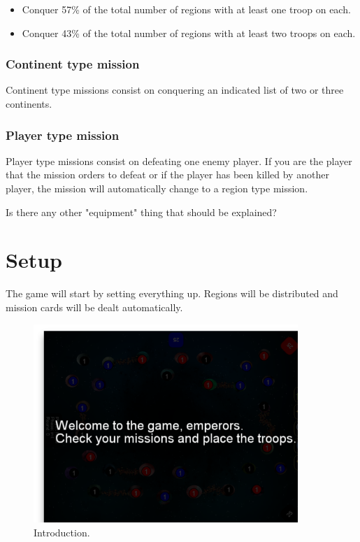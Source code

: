 \documentclass[12pt,a4paper]{article}
\begin{document}
\begin{itemize}
\item Conquer 57\% of the total number of regions with at least one troop on each.
\item Conquer 43\% of the total number of regions with at least two troops on each.
\end{itemize}

\subsubsection{Continent type mission}
Continent type missions consist on conquering an indicated list of two or three continents.

\subsubsection{Player type mission}
Player type missions consist on defeating one enemy player. If you are the player that the mission orders to defeat or if the player has been killed by another player, the mission will automatically change to a region type mission.

\begin{todo}[Alberto]
  Is there any other "equipment" thing that should be explained?
\end{todo}

\section{Setup}
The game will start by setting everything up. Regions will be distributed and mission cards will be dealt automatically.

\begin{figure}[h!]
\centering
\includegraphics[width=10cm]{pic/screenshot01.png}
\caption{Introduction.}
\label{fig:setup}
\end{figure}
\end{document}
